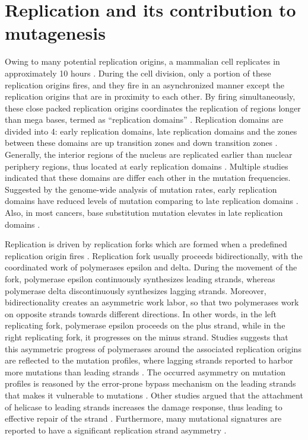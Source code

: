 \section{Replication and its contribution to mutagenesis}

Owing to many potential replication origins, a mammalian cell replicates in approximately 10 hours \citep{takebayashi2017anatomy}. During the cell division, only a portion of these replication origins fires, and they fire in an asynchronized manner except the replication origins that are in proximity to each other. By firing simultaneously, these close packed replication origins coordinates the replication of regions longer than mega bases, termed as “replication domains” \citep{jackson1998replicon}. Replication domains are divided into 4: early replication domains, late replication domains and the zones between these domains are up transition zones and down transition zones \citep{farkash2008global,hansen2010sequencing,hiratani2008global,koren2014genetic,nakayasu1989mapping,o1992dynamic}. Generally, the interior regions of the nucleus are replicated earlier than nuclear periphery regions, thus located at early replication domains \citep{dimitrova2002spatio}. Multiple studies indicated that these domains are differ each other in the mutation frequencies. Suggested by the genome-wide analysis of mutation rates, early replication domains have reduced levels of mutation comparing to late replication domains \citep{lawrence2013mutational,stamatoyannopoulos2009human}. Also, in most cancers, base substitution mutation elevates in late replication domains \citep{schuster2012chromatin}.

Replication is driven by replication forks which are formed when a predefined replication origin fires \citep{langston2009whither}. Replication fork usually proceeds bidirectionally, with the coordinated work of polymerases \gls{epsilon} and \gls{delta}. During the movement of the fork, polymerase \gls{epsilon} continuously synthesizes leading strands, whereas polymerase \gls{delta} discontinuously synthesizes lagging strands. Moreover, bidirectionality creates an asymmetric work labor, so that two polymerases work on opposite strands towards different directions. In other words, in the left replicating fork, polymerase \gls{epsilon} proceeds on the plus strand, while in the right replicating fork, it progresses on the minus strand. Studies suggests that this asymmetric progress of polymerases around the associated replication origins are reflected to the mutation profiles, where lagging strands reported to harbor more mutations than leading strands \citep{haradhvala2016mutational,lujan2012mismatch,reijns2015lagging,shinbrot2014exonuclease}. The occurred asymmetry on mutation profiles is reasoned by the error-prone bypass mechanism on the leading strands that makes it vulnerable to mutations \citep{seplyarskiy2019error}. Other studies argued that the attachment of helicase to leading strands increases the damage response, thus leading to effective repair of the strand \citep{hedglin2017eukaryotic,yeeles2013rescuing}. Furthermore, many mutational signatures are reported to have a significant replication strand asymmetry \citep{tomkova2018mutational}.


